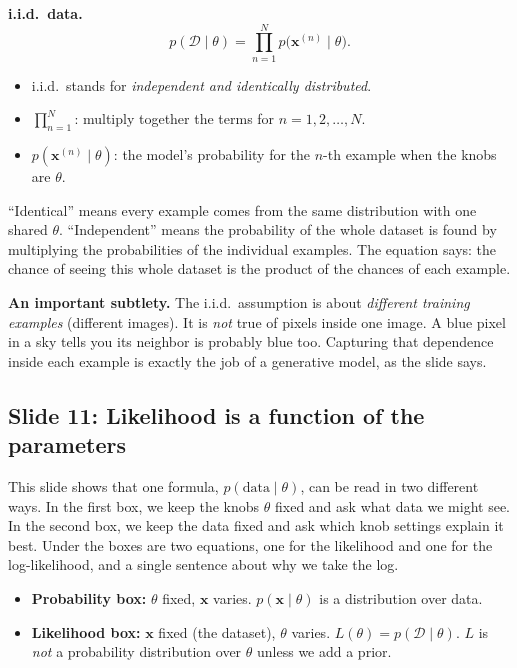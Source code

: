 \textbf{i.i.d.\ data.}
\[
p(\mathcal{D}\mid\theta)=\prod_{n=1}^{N}p\big(\mathbf{x}^{(n)}\mid\theta\big).
\]
\begin{itemize}
\item i.i.d.\ stands for \textit{independent and identically distributed}.
\item $\prod_{n=1}^{N}$: multiply together the terms for $n=1,2,\dots,N$.
\item $p(\mathbf{x}^{(n)}\mid\theta)$: the model's probability for the $n$-th example when the knobs are $\theta$.
\end{itemize}
``Identical'' means every example comes from the same distribution with one shared $\theta$. ``Independent'' means the probability of the whole dataset is found by multiplying the probabilities of the individual examples. The equation says: the chance of seeing this whole dataset is the product of the chances of each example.

\textbf{An important subtlety.} The i.i.d.\ assumption is about \textit{different training examples} (different images). It is \textit{not} true of pixels inside one image. A blue pixel in a sky tells you its neighbor is probably blue too. Capturing that dependence inside each example is exactly the job of a generative model, as the slide says.

\subsection*{Slide 11: Likelihood is a function of the parameters}

This slide shows that one formula, $p(\text{data}\mid\theta)$, can be read in two different ways. In the first box, we keep the knobs $\theta$ fixed and ask what data we might see. In the second box, we keep the data fixed and ask which knob settings explain it best. Under the boxes are two equations, one for the likelihood and one for the log-likelihood, and a single sentence about why we take the log.
\begin{itemize}
\item \textbf{Probability box:} $\theta$ fixed, $\mathbf{x}$ varies. $p(\mathbf{x}\mid\theta)$ is a distribution over data.
\item \textbf{Likelihood box:} $\mathbf{x}$ fixed (the dataset), $\theta$ varies. $L(\theta)=p(\mathcal{D}\mid\theta)$. $L$ is \textit{not} a probability distribution over $\theta$ unless we add a prior.
\end{itemize}

